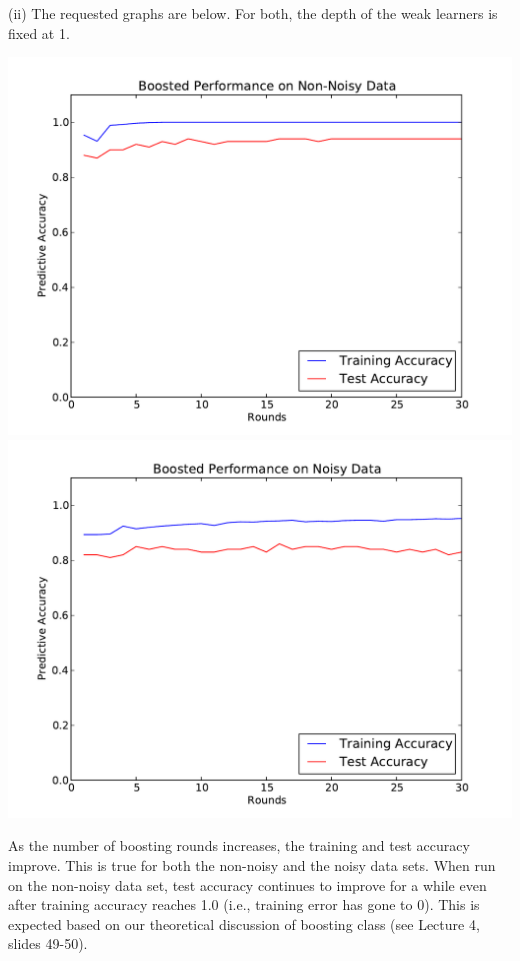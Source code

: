 \documentclass[solution, letterpaper]{cs121}
\begin{document}
(ii) The requested graphs are below. For both, the depth of the weak learners is fixed at 1.
\begin{center}
\includegraphics[scale=0.7]{boost-non-noisy.pdf}
\includegraphics[scale=0.7]{boost-noisy.pdf}
\end{center}
As the number of boosting rounds increases, the training and test accuracy improve. This is true for both the non-noisy and the noisy data sets. When run on the non-noisy data set, test accuracy continues to improve for a while even after training accuracy reaches 1.0 (i.e., training error has gone to 0). This is expected based on our theoretical discussion of boosting class (see Lecture 4, slides 49-50). \\
\end{document}
